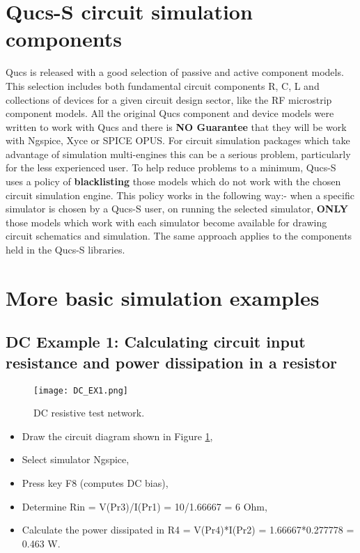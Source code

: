 \section{Qucs-S circuit simulation components}
Qucs is released with a good selection of passive and active component models.  This selection includes both fundamental circuit components R, C, L and collections of devices for a given circuit design sector, like the RF microstrip component models.  All the original Qucs component and device models were written
to work with Qucs and there is \textbf{NO Guarantee} that they will be work with Ngspice, Xyce or SPICE OPUS. For circuit simulation packages which take advantage of simulation multi-engines this can be a serious problem, particularly for the less experienced user.  To help reduce problems to a minimum, Qucs-S uses a policy of \textbf{blacklisting} those models which do not work with the chosen circuit simulation engine. This policy works in the following way:- when a specific simulator is chosen by a Qucs-S  user, on running the selected simulator, \textbf{ONLY} those models which work with each simulator become available for drawing circuit schematics and simulation.  The same approach applies to the components held in the Qucs-S libraries.

\section{More basic simulation examples}
\subsection{DC Example 1: Calculating circuit input resistance and power dissipation in a resistor}
 \begin{figure}[h]
	\centering
	\texttt{[image: DC\_EX1.png]}
	\caption{ DC resistive test network.}
	\label{Fig20}
\end{figure}
\begin{itemize}
	\item {Draw the circuit diagram shown in Figure \ref{Fig20}, }
	\item {Select simulator Ngspice, }
	\item {Press key F8 (computes DC bias), }
	\item {Determine Rin = V(Pr3)/I(Pr1) = 10/1.66667 = 6 Ohm, }
	\item {Calculate the power dissipated in R4 = V(Pr4)*I(Pr2) = 1.66667*0.277778 = 0.463 W. }
\end{itemize}
